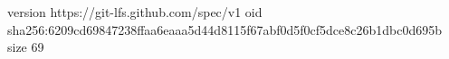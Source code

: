 version https://git-lfs.github.com/spec/v1
oid sha256:6209cd69847238ffaa6eaaa5d44d8115f67abf0d5f0cf5dce8c26b1dbc0d695b
size 69

